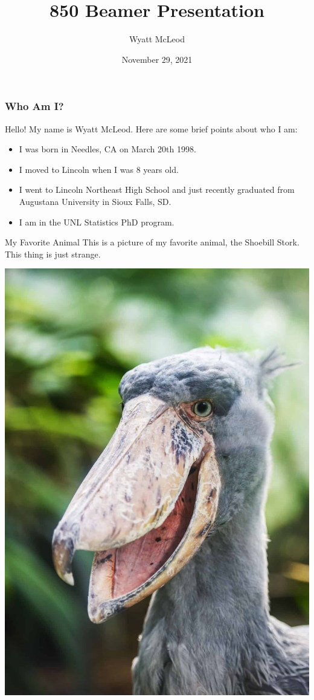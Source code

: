 \documentclass{beamer}
\title{850 Beamer Presentation}
\author{Wyatt McLeod}
\date{November 29, 2021}
\begin{document}
\frame{\titlepage}

\begin{frame}
\frametitle{Who Am I?}
Hello! My name is Wyatt McLeod. Here are some brief points about who I am:
  \begin{itemize}
\item I was born in Needles, CA on March 20th 1998.
\item I moved to Lincoln when I was 8 years old.
\item I went to Lincoln Northeast High School and just recently graduated from Augustana University in Sioux Falls, SD.
\item I am in the UNL Statistics PhD program.
\end{itemize}
\end{frame}

\begin{frame}{My Favorite Animal}
This is a picture of my favorite animal, the Shoebill Stork. This thing is just strange.

\begin{center}
\includegraphics[scale=0.1]{shoebill-stork.jpg}
\end{center}
\end{frame}
\end{document}
